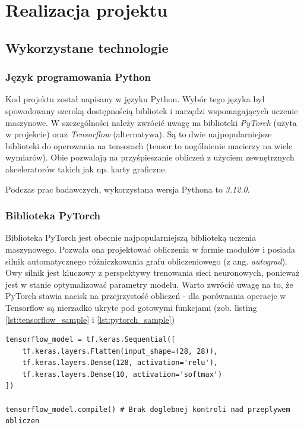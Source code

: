 \chapter{Realizacja projektu}


\section{Wykorzystane technologie}

\subsection{Język programowania Python}

Kod projektu został napisany w języku Python. Wybór tego języka był spowodowany szeroką dostępnością bibliotek i
narzędzi wspomagających uczenie maszynowe. W szczególności należy zwrócić uwagę na biblioteki \textit{PyTorch} (użyta w projekcie) oraz \textit{Tensorflow} (alternatywa).
Są to dwie najpopularniejsze biblioteki do operowania na tensorach (tensor to uogólnienie macierzy na wiele wymiarów).
Obie pozwalają na przyśpieszanie obliczeń z użyciem zewnętrznych akceleratorów takich jak np. karty graficzne.

Podczas prac badawczych, wykorzystana wersja Pythona to \textit{3.12.0}.

\subsection{Biblioteka PyTorch}

Biblioteka PyTorch jest obecnie najpopularniejszą biblioteką uczenia maszynowego.
Pozwala ona projektować obliczenia w formie modułów i posiada silnik automatycznego różniczkowania grafu obliczeniowego (z ang. \textit{autograd}).
Owy silnik jest kluczowy z perspektywy trenowania sieci neuronowych, ponieważ jest w stanie optymalizować parametry modelu.
Warto zwrócić uwagę na to, że PyTorch stawia nacisk na przejrzystość obliczeń - dla porównania operacje w Tensorflow są nierzadko
ukryte pod gotowymi funkcjami (zob. listing \ref{lst:tensorflow_sample} i \ref{lst:pytorch_sample})

\begin{lstlisting}[language=ipython,caption={Przykładowa sieć neuronowa w Tensorflow},label={lst:tensorflow_sample}]
tensorflow_model = tf.keras.Sequential([
    tf.keras.layers.Flatten(input_shape=(28, 28)),
    tf.keras.layers.Dense(128, activation='relu'),
    tf.keras.layers.Dense(10, activation='softmax')
])

tensorflow_model.compile() # Brak doglebnej kontroli nad przeplywem obliczen
\end{lstlisting}


